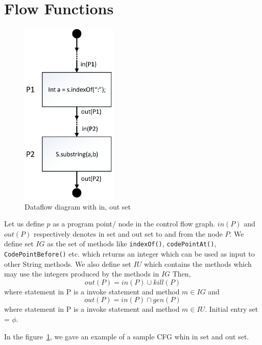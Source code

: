 \section{Flow Functions}
\label{flowFunctions}

\begin{figure}[b]
\centering
\includegraphics[width=1.8in]{images/dataflow.png}
\caption{Dataflow diagram with in, out set}
\label{fig:dataflow}
\end{figure}


Let us define $p$ as a program point/ node in the control flow graph. $in(P)$
and $out(P)$ respectively denotes in set and out set to and from the node $P$.
We define set $IG$ as the set of methods like \texttt{indexOf()},
\texttt{codePointAt()}, \texttt{CodePointBefore()} etc. which returns an integer
which can be used as input to other String methods. We also define set $IU$
which contains the methods which may use the integers produced by the methods in
$IG$ Then, 
$$out(P) = in(P) \cup kill(P)$$ where statement in P is a invoke statement and
method $m \in IG$ and
$$out(P) = in(P) \cap gen(P)$$ where statement in P is a invoke statement and
method $m \in IU$. Initial entry set = ${\phi}$.

In the figure~\ref{fig:dataflow}, we gave an example of a sample CFG whin in set
and out set.
